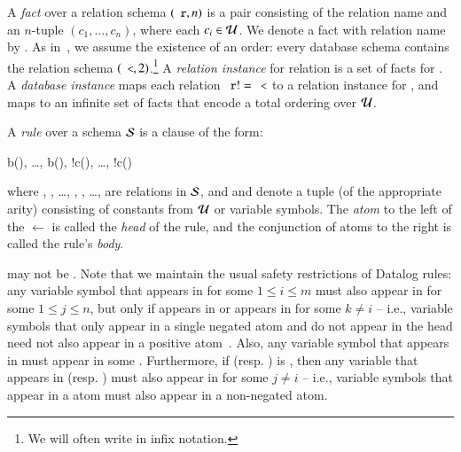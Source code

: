 A {\em fact} over a relation schema $(\dedalus{r}, n)$ is a pair consisting of
the relation name  and an $n$-tuple $(c_1,\ldots,c_n)$, where each
$c_i \in \univ$.  We denote a fact with relation name  by
.  As in~\cite{immerman-ptime}, we assume
the existence of an order: every database schema contains the relation schema
$(\dedalus{<},2)$.\footnote{We will often write \dedalus{<} in infix notation.}
A {\em relation instance} for relation  is a set of facts for
.  A {\em database instance} maps each relation $\dedalus{r} !=
\dedalus{<}$ to a relation instance for , and maps \dedalus{<} to an
infinite set of \dedalus{<} facts that encode a total ordering over $\univ$.

A {\em rule} over a schema $\schema$ is a clause of the form:

\begin{Drules}
        {b(), \ldots, b(), !c(), \ldots, !c()}
\end{Drules}

where , , \ldots, ,
, \ldots,  are relations in
$\schema$, and  and 
denote a tuple (of the appropriate arity) consisting of
constants from $\univ$ or variable symbols.  The {\em atom} to the left of the $\leftarrow$ is called the {\em head} of the rule, and the conjunction of atoms to the right is called the rule's {\em body}.

 may not be \dedalus{<}.  Note that we maintain the usual safety
restrictions of Datalog rules: any variable symbol  that appears in
 for some $1 \leq i \leq m$ must also appear in
 for some $1 \leq j \leq n$, but only if 
appears in  or  appears in
 for some $k \neq i$ -- i.e., variable symbols that
only appear in a single negated atom and do not appear in the head need not also
appear in a positive atom~\cite{ullmanbook}.  Also, any variable symbol  that appears in  must appear in some .
Furthermore, if  (resp. ) is \dedalus{<}, then any variable that appears in  (resp. ) must also appear in  for some $j \neq i$ -- i.e., variable symbols that appear in a \dedalus{<} atom must also appear in a non-negated atom.

